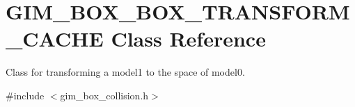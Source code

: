 \hypertarget{class_g_i_m___b_o_x___b_o_x___t_r_a_n_s_f_o_r_m___c_a_c_h_e}{\section{G\+I\+M\+\_\+\+B\+O\+X\+\_\+\+B\+O\+X\+\_\+\+T\+R\+A\+N\+S\+F\+O\+R\+M\+\_\+\+C\+A\+C\+H\+E Class Reference}
\label{class_g_i_m___b_o_x___b_o_x___t_r_a_n_s_f_o_r_m___c_a_c_h_e}
}


Class for transforming a model1 to the space of model0.  




{\ttfamily \#include $<$gim\+\_\+box\+\_\+collision.\+h$>$}

